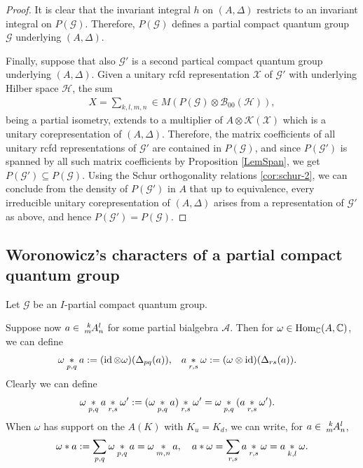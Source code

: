 \begin{proof}
 It is clear that the invariant integral $h$ on $(A,\Delta)$ restricts to an invariant
integral on $P(\mathscr{G})$. Therefore, $P(\mathscr{G})$ defines a partial compact quantum group $\mathscr{G}$ underlying $(A,\Delta)$. 


Finally, suppose that also $\mathscr{G}'$ is a second partical compact quantum group underlying $(A,\Delta)$.   Given  a unitary rcfd representation $\mathscr{X}$ of $\mathscr{G}'$ with underlying Hilber space $\mathscr{H}$, the sum
\begin{align*}
  X=\sum_{k,l,m,n} \in M(P(\mathscr{G}) \otimes \mathcal{B}_{00}(\mathscr{H})),
\end{align*}
being a partial isometry, extends to a multiplier of $A \otimes \mathcal{K}(\mathscr{X})$ which is a unitary corepresentation of $(A,\Delta)$. Therefore, the matrix coefficients of all  unitary rcfd representations of $\mathscr{G}'$ are contained in $P(\mathscr{G})$, and since $P(\mathscr{G'})$ is spanned by all such matrix coefficients by Proposition \ref{LemSpan},  we get $P(\mathscr{G'}) \subseteq P(\mathscr{G})$. Using the Schur orthogonality relations \ref{cor:schur-2}, we can conclude from the density of $P(\mathscr{G'})$ in $A$ that up to equivalence, every  irreducible unitary corepresentation of $(A,\Delta)$ arises from a representation of  $\mathscr{G'}$ as above, and hence  $P(\mathscr{G'}) = P(\mathscr{G})$.
\end{proof}

\subsection{Woronowicz's characters of a partial compact quantum group}


 Let $\mathscr{G}$ be an  $I$-partial compact quantum group.


Suppose now $a\in \Gr{A}{k}{l}{m}{n}$ for some partial bialgebra $\mathscr{A}$. Then for $\omega \in \operatorname{Hom}_{\mathbb{C}}(A,\mathbb{C})$, we can define
\begin{align*}
  \omega \underset{p,q}{\ast} a
&:= (\operatorname{id} \otimes \omega) (\Delta_{pq}(a)), & a \underset{r,s}{\ast}
\omega&:=(\omega \otimes \operatorname{id})(\Delta_{rs}(a)).\end{align*} Clearly we can define
\begin{align*} \omega \underset{p,q}{\ast} a \underset{r,s}{\ast}
\omega'&:= (\omega \underset{p,q}{\ast} a)\underset{r,s}{\ast} \omega' = \omega \underset{p,q}{\ast}(a \underset{r,s}{\ast} \omega').\end{align*}
When $\omega$ has support on the $A(K)$ with $K_u=K_d$, we can write, for $a\in \Gr{A}{k}{l}{m}{n}$, \[\omega\ast a := \sum_{p,q} \omega\underset{p,q}{\ast}a = \omega\underset{m,n}{\ast}a,\quad  a\ast \omega = \sum_{r,s} a\underset{r,s}{\ast}\omega = a\underset{k,l}{\ast}\omega.\] 

